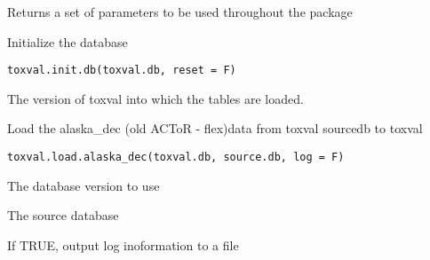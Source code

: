 \documentclass[letterpaper]{book}
\begin{document}
%
\begin{Value}
Returns a set of parameters to be used throughout the package
\end{Value}
%
\begin{Description}\relax
Initialize the database
\end{Description}
%
\begin{Usage}
\begin{verbatim}
toxval.init.db(toxval.db, reset = F)
\end{verbatim}
\end{Usage}
%
\begin{Arguments}
\begin{ldescription}
\item[\code{toxval.db}] The version of toxval into which the tables are loaded.
\end{ldescription}
\end{Arguments}
%
\begin{Description}\relax
Load the alaska\_dec (old ACToR - flex)data  from toxval sourcedb to toxval
\end{Description}
%
\begin{Usage}
\begin{verbatim}
toxval.load.alaska_dec(toxval.db, source.db, log = F)
\end{verbatim}
\end{Usage}
%
\begin{Arguments}
\begin{ldescription}
\item[\code{toxval.db}] The database version to use

\item[\code{source.db}] The source database

\item[\code{log}] If TRUE, output log inoformation to a file
\end{ldescription}
\end{Arguments}
\end{document}
